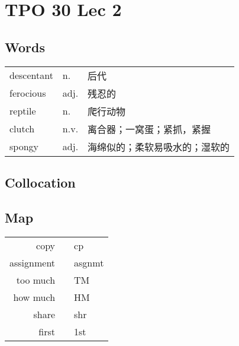 \section{TPO 30 Lec 2}

\subsection{Words}

\begin{tabular}{lll}
    descentant & n.   & 后代              \\
    ferocious  & adj. & 残忍的             \\
    reptile    & n.   & 爬行动物            \\
    clutch     & n.v. & 离合器；一窝蛋；紧抓，紧握   \\
    spongy     & adj. & 海绵似的；柔软易吸水的；湿软的 \\
\end{tabular}

\subsection{Collocation}

\subsection{Map}

\begin{tabular}{rc@{\quad$\to$\quad}l}
    copy       &  & cp     \\
    assignment &  & asgnmt \\
    too much   &  & TM     \\
    how much   &  & HM     \\
    share      &  & shr    \\
    first      &  & 1st    \\
\end{tabular}
